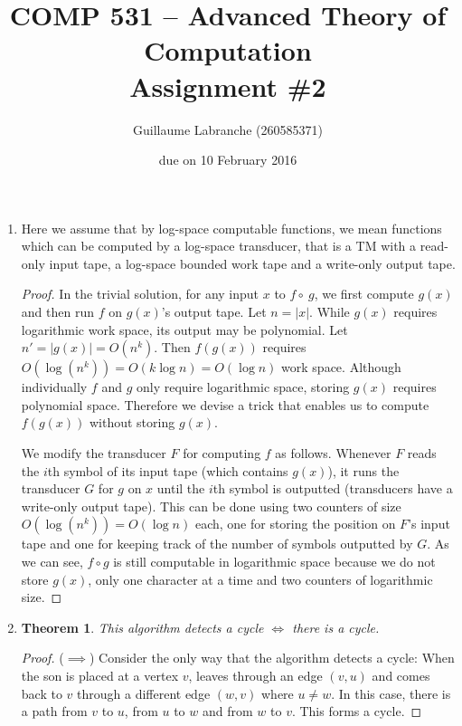 \documentclass{article}
\author{Guillaume Labranche (260585371)}
\title{COMP 531 -- Advanced Theory of Computation\\Assignment \#2}
\date{due on 10 February 2016}
\newtheorem{theorem}{Theorem}
\begin{document}
\maketitle

\begin{enumerate}

\item Here we assume that by log-space computable functions, we mean functions which can be computed by a log-space transducer, that is a TM with a read-only input tape, a log-space bounded work tape and a write-only output tape.

\begin{proof} In the trivial solution, for any input $x$ to $f \circ\ g$, we first compute $g(x)$ and then run $f$ on $g(x)$'s output tape. Let $n=|x|$. While $g(x)$ requires logarithmic work space, its output may be polynomial. Let $n' = |g(x)| = O(n^k)$. Then $f(g(x))$ requires $O(\log(n^k)) = O(k \log n) = O(\log n)$ work space. Although individually $f$ and $g$ only require logarithmic space, storing $g(x)$ requires polynomial space. Therefore we devise a trick that enables us to compute $f(g(x))$ without storing $g(x)$.

We modify the transducer $F$ for computing $f$ as follows. Whenever $F$ reads the $i$th symbol of its input tape (which contains $g(x)$), it runs the transducer $G$ for $g$ on $x$ until the $i$th symbol is outputted (transducers have a write-only output tape). This can be done using two counters of size $O(\log(n^k))=O(\log n)$ each, one for storing the position on $F$'s input tape and one for keeping track of the number of symbols outputted by $G$. As we can see, $f \circ g$ is still computable in logarithmic space because we do not store $g(x)$, only one character at a time and two counters of logarithmic size.
\end{proof}

\newpage
\item \begin{theorem}This algorithm detects a cycle $\iff$ there is a cycle.\end{theorem}
\begin{proof}
($\implies$) Consider the only way that the algorithm detects a cycle: When the son is placed at a vertex $v$, leaves through an edge $(v,u)$ and comes back to $v$ through a different edge $(w,v)$ where $u\not=w$. In this case, there is a path from $v$ to $u$, from $u$ to $w$ and from $w$ to $v$. This forms a cycle.


\end{proof}
\end{enumerate}
\end{document}
